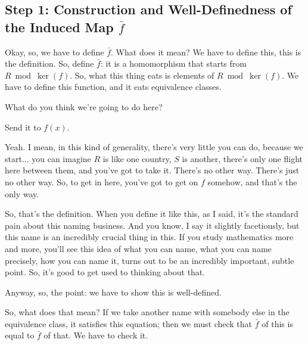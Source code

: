 \begin{proofWrapper}

\subsection{Step 1: Construction and Well-Definedness of the Induced Map \texorpdfstring{$\bar{f}$}{fbar}}

\begin{speech}[00:53:31 - 00:54:07]
Okay, so, we have to define $\bar{f}$. What does it mean? We have to define this, this is the definition. So, define $\bar{f}$: it is a homomorphism that starts from $R \bmod \ker(f)$. So, what this thing eats is elements of $R \bmod \ker(f)$.  We have to define this function, and it eats equivalence classes.  

What do you think we're going to do here?
\end{speech}

\begin{student}
Send it to $f(x)$.
\end{student}

\begin{speech}[00:54:08 - 00:55:09]
Yeah. I mean, in this kind of generality, there's very little you can do, because we start... you can imagine $R$ is like one country, $S$ is another, there's only one flight here between them, and you've got to take it. There's no other way. There's just no other way. So, to get in here, you've got to get on $f$ somehow, and that's the only way. 

So, that's the definition.  When you define it like this, as I said, it's the standard pain about this naming business. And you know, I say it slightly facetiously, but this name is an incredibly crucial thing in this. If you study mathematics more and more, you'll see this idea of what you can name, what you can name precisely, how you can name it, turns out to be an incredibly important, subtle point. So, it's good to get used to thinking about that. 

Anyway, so, the point: we have to show this is well-defined. 
\end{speech}

\begin{speech}[00:55:09 - 00:56:41]
So, what does that mean? If we take another name with somebody else in the equivalence class, it satisfies this equation;  then we must check that $\bar{f}$ of this is equal to $\bar{f}$ of that.  We have to check it. 


\end{speech}
\end{proofWrapper}
